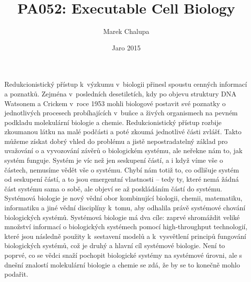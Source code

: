 \documentclass[a4paper]{article}
\title {PA052: Executable Cell Biology}
\author {Marek Chalupa}
\date {Jaro 2015}
\begin{document}
\maketitle

\par
Redukcionistický přístup k~výzkumu v~biologii přinesl spoustu cenných informací a poznatků.
Zejména v~posledních desetiletích, kdy po objevu struktury DNA Watsonem a Crickem v~roce 1953\cite{WatCri1953}
mohli biologové postavit své poznatky o jednotlivých procesech probíhajících v~buňce a živých
organismech na pevném podkladu molekulární biologie a chemie\cite{Kitano}.
Redukcionistický přístup rozbije zkoumanou látku na malé podčásti a poté zkoumá jednotlivé části zvlášť.
Takto můžeme získat dobrý vhled do problému a jistě nepostradatelný základ pro uvažování
o a vyvozování závěrů o biologickém systému, ale neřekne nám to, jak systém funguje.
Systém je víc než jen seskupení částí, a i když víme vše o částech, nemusíme vědět
vše o systému. Chybí nám totiž to, co odlišuje systém od seskupení částí, a to jsou
emergentní vlastnosti -- tedy ty, které nemá žádná část systému sama o sobě, ale
objeví se až poskládáním částí do systému.
Systémová biologie je nový vědní obor kombinující biologii, chemii, matematiku,
informatiku a jiné vědní disciplíny k~tomu, aby odhalila právě systémové
chování biologických systémů. Systémová biologie má dva cíle\cite{Cardelli}: zaprvé
shromáždit veliké množství informací o biologických systémech pomocí high-throughput
technologií, které jsou následně použity k~sestavení modelů a k~vysvětlení principů
fungování biologických systémů, což je druhý a hlavní cíl systémové biologie.
Není to poprvé, co se vědci snaží pochopit biologické systémy na systémové úrovni,
ale s dnešní znalostí molekulární biologie a chemie se zdá, že by se to konečně
mohlo podařit\cite{Kitano}.
\end{document}
